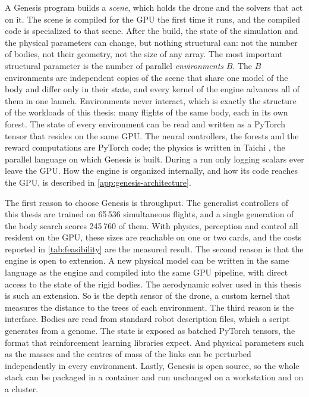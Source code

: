 A Genesis program builds a \emph{scene}, which holds the drone and the solvers that act on it. The scene is compiled for the GPU the first time it runs, and the compiled code is specialized to that scene. After the build, the state of the simulation and the physical parameters can change, but nothing structural can: not the number of bodies, not their geometry, not the size of any array. The most important structural parameter is the number of parallel \emph{environments} $B$. The $B$ environments are independent copies of the scene that share one model of the body and differ only in their state, and every kernel of the engine advances all of them in one launch. Environments never interact, which is exactly the structure of the workloads of this thesis: many flights of the same body, each in its own forest. The state of every environment can be read and written as a PyTorch tensor that resides on the same GPU. The neural controllers, the forests and the reward computations are PyTorch code; the physics is written in Taichi \cite{hu2019taichi, hu2020difftaichi}, the parallel language on which Genesis is built. During a run only logging scalars ever leave the GPU. How the engine is organized internally, and how its code reaches the GPU, is described in \autoref{app:genesis-architecture}.

The first reason to choose Genesis is throughput. The generalist controllers of this thesis are trained on 65\,536 simultaneous flights, and a single generation of the body search scores 245\,760 of them. With physics, perception and control all resident on the GPU, these sizes are reachable on one or two cards, and the costs reported in \autoref{tab:feasibility} are the measured result. The second reason is that the engine is open to extension. A new physical model can be written in the same language as the engine and compiled into the same GPU pipeline, with direct access to the state of the rigid bodies. The aerodynamic solver used in this thesis is such an extension. So is the depth sensor of the drone, a custom kernel that measures the distance to the trees of each environment. The third reason is the interface. Bodies are read from standard robot description files, which a script generates from a genome. The state is exposed as batched PyTorch tensors, the format that reinforcement learning libraries expect. And physical parameters such as the masses and the centres of mass of the links can be perturbed independently in every environment. Lastly, Genesis is open source, so the whole stack can be packaged in a container and run unchanged on a workstation and on a cluster.

